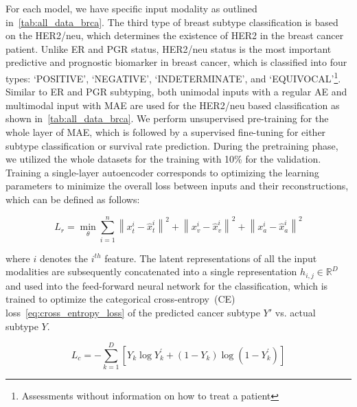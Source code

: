 \hspace*{3.5mm} For each model, we have specific input modality as outlined in~\cref{tab:all_data_brca}. The third type of breast subtype classification is based on the HER2/neu, which determines the existence of HER2 in the breast cancer patient. Unlike ER and PGR status, HER2/neu status is the most important predictive and prognostic biomarker in breast cancer, which is classified into four types: `POSITIVE', `NEGATIVE', `INDETERMINATE', and `EQUIVOCAL'\footnote{Assessments without information on how to treat a patient}. Similar to ER and PGR subtyping, both unimodal inputs with a regular AE and multimodal input with MAE are used for the HER2/neu based classification as shown in~\cref{tab:all_data_brca}. 
We perform unsupervised pre-training for the whole layer of MAE, which is followed by a supervised fine-tuning for either subtype classification or survival rate prediction. During the pretraining phase, we utilized the whole datasets for the training with 10\% for the validation. Training a single-layer autoencoder corresponds to optimizing the learning parameters to minimize the overall loss between inputs and their reconstructions, which can be defined as follows:

\vspace{-2mm}
\begin{equation}
   L_{r} = \min _{\theta} \sum_{i=1}^{n} \left\|x_{t}^{i}-\hat{x}_{t}^{i}\right\|^{2}+\left\|x_{v}^{i}-\hat{x}_{v}^{i}\right\|^{2}+\left\|x_{a}^{i}-\hat{x}_{a}^{i}\right\|^{2}
   \label{eq:recons_loss}
\end{equation}

where $i$ denotes the $i^{th}$ feature. The latent representations of all the input modalities are subsequently concatenated into a single representation $h_{i,j} \in \mathbb{R}^{D}$ and used into the feed-forward neural network for the classification, which is trained to optimize the categorical cross-entropy~(CE) loss~\cref{eq:cross_entropy_loss} of the predicted cancer subtype $Y \prime$ vs. actual subtype $Y$. 

\vspace{-2mm}
\begin{equation} 
    L_{c}=-\sum_{k=1}^{D}\left[Y_{k} \log Y_{k}^{\prime}+\left(1-Y_{k}\right) \log \left(1-Y_{k}^{\prime}\right)\right]
    \label{eq:cross_entropy_loss}
\end{equation} 

